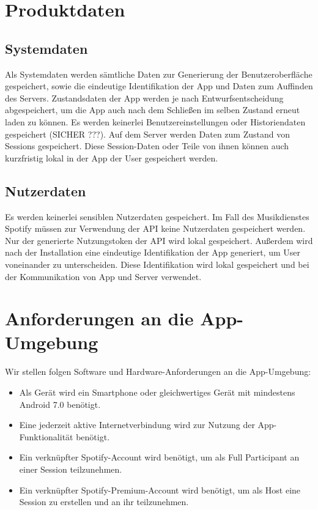 \documentclass[oneside, ngerman]{sdqtechreport}
\begin{document}
\chapter{Produktdaten}
\label{chap:Produktdaten}

\section{Systemdaten}
\label{sec:Produktdaten:Systemdaten}

Als Systemdaten werden sämtliche Daten zur Generierung der Benutzeroberfläche gespeichert, sowie die eindeutige Identifikation der App und Daten zum Auffinden des Servers. Zustandsdaten der App werden je nach Entwurfsentscheidung abgespeichert, um die App auch nach dem Schließen im selben Zustand erneut laden zu können. Es werden keinerlei Benutzereinstellungen oder Historiendaten gespeichert (SICHER ???). Auf dem Server werden Daten zum Zustand von Sessions gespeichert. Diese Session-Daten oder Teile von ihnen können auch kurzfristig lokal in der App der User gespeichert werden.

\section{Nutzerdaten}
\label{sec:Produktdaten:Nutzerdaten}

Es werden keinerlei sensiblen Nutzerdaten gespeichert. Im Fall des Musikdienstes Spotify müssen zur Verwendung der API keine Nutzerdaten gespeichert werden. Nur der generierte Nutzungstoken der API wird lokal gespeichert. Außerdem wird nach der Installation eine eindeutige Identifikation der App generiert, um User voneinander zu unterscheiden. Diese Identifikation wird lokal gespeichert und bei der Kommunikation von App und Server verwendet.



\chapter{Anforderungen an die App-Umgebung}
\label{chap:Appumgebung}

Wir stellen folgen Software und Hardware-Anforderungen an die App-Umgebung:

\begin{itemize}
    \item Als Gerät wird ein Smartphone oder gleichwertiges Gerät mit mindestens Android 7.0 benötigt.
    \item Eine jederzeit aktive Internetverbindung wird zur Nutzung der App-Funktionalität benötigt.
    \item Ein verknüpfter Spotify-Account wird benötigt, um als Full Participant an einer Session teilzunehmen.
    \item Ein verknüpfter Spotify-Premium-Account wird benötigt, um als Host eine Session zu erstellen und an ihr teilzunehmen.
\end{itemize}
\end{document}
